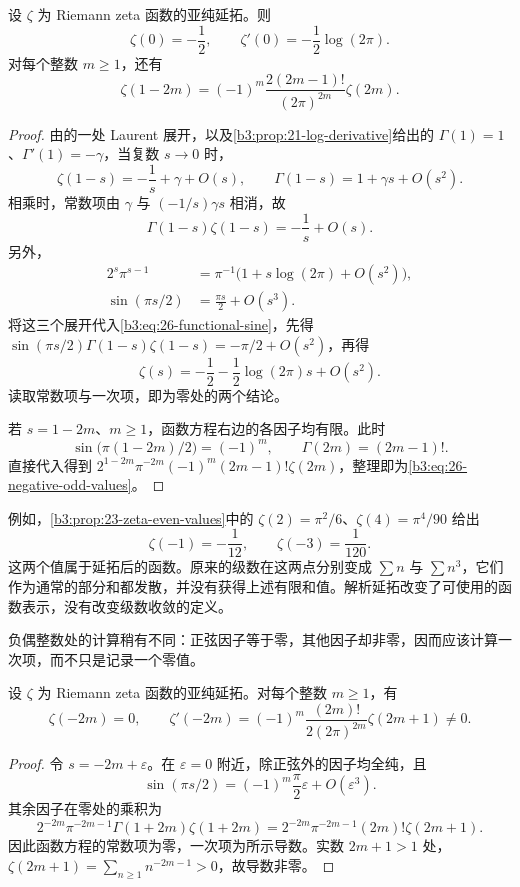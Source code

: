 \begin{proposition}[零处与负奇整数处的值]\label{b3:prop:26-special-values}
设 \(\zeta\) 为 Riemann zeta 函数的亚纯延拓。则
\[
 \zeta(0)=-\frac12,\qquad
 \zeta'(0)=-\frac12\log(2\pi).
\]
对每个整数 \(m\ge1\)，还有
\begin{equation}\label{b3:eq:26-negative-odd-values}
 \zeta(1-2m)
 =(-1)^m\frac{2(2m-1)!}{(2\pi)^{2m}}\zeta(2m).
\end{equation}
\end{proposition}
\begin{proof}
由的一处 Laurent 展开，以及\cref{b3:prop:21-log-derivative}给出的 \(\Gamma(1)=1\)、\(\Gamma'(1)=-\gamma\)，当复数 \(s\to0\) 时，
\[
 \zeta(1-s)=-\frac1s+\gamma+O(s),\qquad
 \Gamma(1-s)=1+\gamma s+O(s^2).
\]
相乘时，常数项由 \(\gamma\) 与 \((-1/s)\gamma s\) 相消，故
\[
 \Gamma(1-s)\zeta(1-s)=-\frac1s+O(s).
\]
另外，
\begin{align*}
 2^s\pi^{s-1}
 &=\pi^{-1}\bigl(1+s\log(2\pi)+O(s^2)\bigr),\\
 \sin(\pi s/2)&=\frac{\pi s}2+O(s^3).
\end{align*}
将这三个展开代入\eqref{b3:eq:26-functional-sine}，先得
\(\sin(\pi s/2)\Gamma(1-s)\zeta(1-s)=-\pi/2+O(s^2)\)，再得
\[
 \zeta(s)=-\frac12-\frac12\log(2\pi)s+O(s^2).
\]
读取常数项与一次项，即为零处的两个结论。

若 \(s=1-2m\)、\(m\ge1\)，函数方程右边的各因子均有限。此时
\[
 \sin\bigl(\pi(1-2m)/2\bigr)=(-1)^m,\qquad
 \Gamma(2m)=(2m-1)!.
\]
直接代入得到
\(2^{1-2m}\pi^{-2m}(-1)^m(2m-1)!\zeta(2m)\)，整理即为\eqref{b3:eq:26-negative-odd-values}。
\end{proof}

例如，\cref{b3:prop:23-zeta-even-values}中的 \(\zeta(2)=\pi^2/6\)、\(\zeta(4)=\pi^4/90\) 给出
\[
 \zeta(-1)=-\frac1{12},\qquad \zeta(-3)=\frac1{120}.
\]
这两个值属于延拓后的函数。原来的级数在这两点分别变成 \(\sum n\) 与 \(\sum n^3\)，它们作为通常的部分和都发散，并没有获得上述有限和值。解析延拓改变了可使用的函数表示，没有改变级数收敛的定义。

负偶整数处的计算稍有不同：正弦因子等于零，其他因子却非零，因而应该计算一次项，而不只是记录一个零值。

\begin{proposition}[负偶整数处的导数]\label{b3:prop:26-negative-even-derivative}
设 \(\zeta\) 为 Riemann zeta 函数的亚纯延拓。对每个整数 \(m\ge1\)，有
\begin{equation}\label{b3:eq:26-negative-even-derivative}
 \zeta(-2m)=0,\qquad
 \zeta'(-2m)=(-1)^m
       \frac{(2m)!}{2(2\pi)^{2m}}\zeta(2m+1)\ne0.
\end{equation}
\end{proposition}
\begin{proof}
令 \(s=-2m+\varepsilon\)。在 \(\varepsilon=0\) 附近，除正弦外的因子均全纯，且
\[
 \sin(\pi s/2)=(-1)^m\frac\pi2\varepsilon+O(\varepsilon^3).
\]
其余因子在零处的乘积为
\[
 2^{-2m}\pi^{-2m-1}\Gamma(1+2m)\zeta(1+2m)
 =2^{-2m}\pi^{-2m-1}(2m)!\zeta(2m+1).
\]
因此函数方程的常数项为零，一次项为所示导数。实数 \(2m+1>1\) 处，\(\zeta(2m+1)=\sum_{n\ge1}n^{-2m-1}>0\)，故导数非零。
\end{proof}

